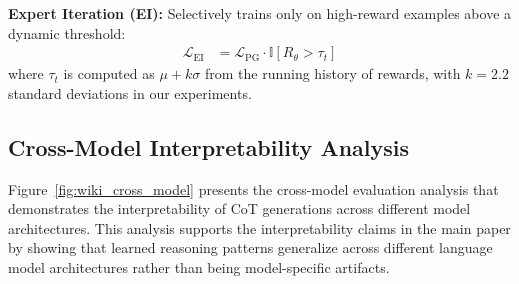 \documentclass{article} %
\begin{document}
\textbf{Expert Iteration (EI):} Selectively trains only on high-reward examples above a dynamic threshold:
\begin{align}
\mathcal{L}_{\text{EI}} &= \mathcal{L}_{\text{PG}} \cdot \mathbb{I}[R_\theta > \tau_t]
\end{align}
where $\tau_t$ is computed as $\mu + k\sigma$ from the running history of rewards, with $k = 2.2$ standard deviations in our experiments.

% 

\subsection{Cross-Model Interpretability Analysis}
Figure~\ref{fig:wiki_cross_model} presents the cross-model evaluation analysis that demonstrates the interpretability of CoT generations across different model architectures. This analysis supports the interpretability claims in the main paper by showing that learned reasoning patterns generalize across different language model architectures rather than being model-specific artifacts.
\end{document}
